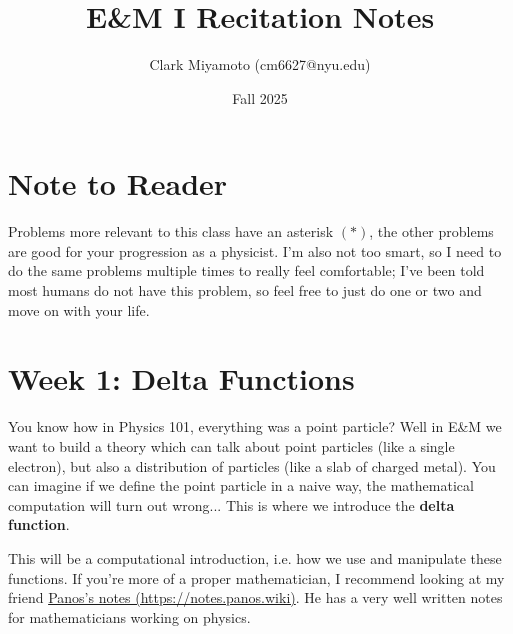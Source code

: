 \documentclass[12pt,fleqn]{article}
\title{E\&M I Recitation Notes}
\author{Clark Miyamoto (cm6627@nyu.edu)}
\date{Fall 2025}
\numberwithin{equation}{section} %
\newcounter{problem}
\begin{document}
\maketitle

\section{Note to Reader}
Problems more relevant to this class have an asterisk $(*)$, the other problems are good for your progression as a physicist. I'm also not too smart, so I need to do the same problems multiple times to really feel comfortable; I've been told most humans do not have this problem, so feel free to just do one or two and move on with your life.

\tableofcontents

\newpage
\section{Week 1: Delta Functions}


You know how in Physics 101, everything was a point particle? Well in E\&M we want to build a theory which can talk about point particles (like a single electron), but also a distribution of particles (like a slab of charged metal). You can imagine if we define the point particle in a naive way, the mathematical computation will turn out wrong... This is where we introduce the \textbf{delta function}.
\begin{sidework}
	This will be a computational introduction, i.e. how we use and manipulate these functions. If you're more of a proper mathematician, I recommend looking at my friend \href{https://notes.panos.wiki/Analysis+Distributions}{Panos's notes (https://notes.panos.wiki)}. He has a very well written notes for mathematicians working on physics.
\end{sidework}
\end{document}
